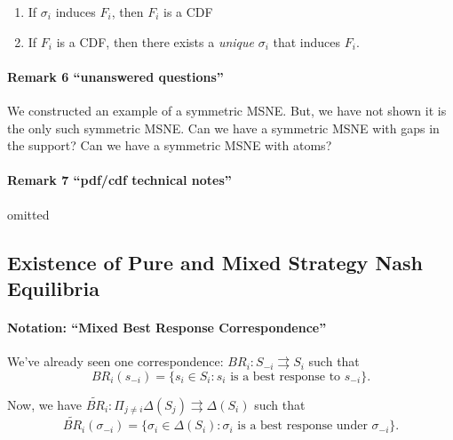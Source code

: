 \documentclass[
]{article}
\providecommand{\tightlist}{%
  \setlength{\itemsep}{0pt}\setlength{\parskip}{0pt}}
\begin{document}
\begin{enumerate}
\def\labelenumi{\arabic{enumi}.}
\tightlist
\item
  If \(\sigma_i\) induces \(F_i\), then \(F_i\) is a CDF
\item
  If \(F_i\) is a CDF, then there exists a \emph{unique} \(\sigma_i\)
  that induces \(F_i\).
\end{enumerate}

\hypertarget{remark-6-unanswered-questions}{%
\paragraph{Remark 6 ``unanswered
questions''}\label{remark-6-unanswered-questions}}

We constructed an example of a symmetric MSNE. But, we have not shown it
is the only such symmetric MSNE. Can we have a symmetric MSNE with gaps
in the support? Can we have a symmetric MSNE with atoms?

\hypertarget{remark-7-pdfcdf-technical-notes}{%
\paragraph{Remark 7 ``pdf/cdf technical
notes''}\label{remark-7-pdfcdf-technical-notes}}

omitted

\hypertarget{existence-of-pure-and-mixed-strategy-nash-equilibria}{%
\subsection{Existence of Pure and Mixed Strategy Nash
Equilibria}\label{existence-of-pure-and-mixed-strategy-nash-equilibria}}

\hypertarget{notation-mixed-best-response-correspondence}{%
\paragraph{Notation: ``Mixed Best Response
Correspondence''}\label{notation-mixed-best-response-correspondence}}

We've already seen one correspondence:
\(BR_i: S_{-i} \rightrightarrows S_i\) such that
\[BR_i(s_{-i}) = \{s_i \in S_i: s_i \text{ is a best response to } s_{-i}\}.\]

Now, we have
\(\tilde{BR}_i: \Pi_{j \neq i} \Delta (S_j) \rightrightarrows \Delta(S_i)\)
such that
\[\tilde{BR}_i(\sigma_{-i}) = \{\sigma_i \in \Delta(S_i): \sigma_i \text{ is a best response under } \sigma_{-i}\}.\]
\end{document}
